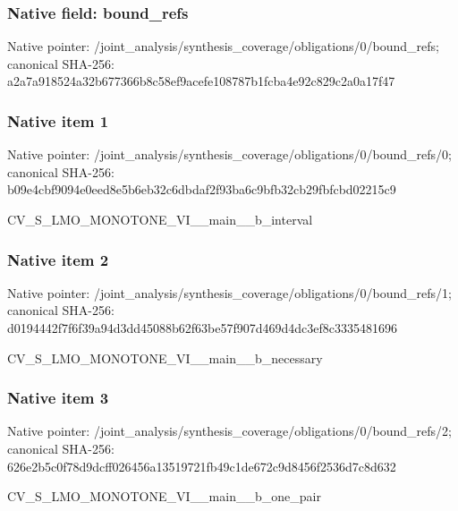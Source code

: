 \documentclass[10pt,a4paper]{article}
\begin{document}
\subsubsection{Native field: bound\_\allowbreak{}refs}
Native pointer: /joint\_\allowbreak{}analysis/synthesis\_\allowbreak{}coverage/obligations/0/bound\_\allowbreak{}refs; canonical SHA-256: a2a7a918524a32b677366b8c58ef9acefe108787b1fcba4e92c829c2a0a17f47

\subsubsection{Native item 1}
Native pointer: /joint\_\allowbreak{}analysis/synthesis\_\allowbreak{}coverage/obligations/0/bound\_\allowbreak{}refs/0; canonical SHA-256: b09e4cbf9094e0eed8e5b6eb32c6dbdaf2f93ba6c9bfb32cb29fbfcbd02215c9

\begingroup\raggedright\sloppy CV\_\allowbreak{}S\_\allowbreak{}LMO\_\allowbreak{}MONOTONE\_\allowbreak{}VI\_\allowbreak{}\_\allowbreak{}main\_\allowbreak{}\_\allowbreak{}b\_\allowbreak{}interval\par\endgroup

\subsubsection{Native item 2}
Native pointer: /joint\_\allowbreak{}analysis/synthesis\_\allowbreak{}coverage/obligations/0/bound\_\allowbreak{}refs/1; canonical SHA-256: d0194442f7f6f39a94d3dd45088b62f63be57f907d469d4dc3ef8c3335481696

\begingroup\raggedright\sloppy CV\_\allowbreak{}S\_\allowbreak{}LMO\_\allowbreak{}MONOTONE\_\allowbreak{}VI\_\allowbreak{}\_\allowbreak{}main\_\allowbreak{}\_\allowbreak{}b\_\allowbreak{}necessary\par\endgroup

\subsubsection{Native item 3}
Native pointer: /joint\_\allowbreak{}analysis/synthesis\_\allowbreak{}coverage/obligations/0/bound\_\allowbreak{}refs/2; canonical SHA-256: 626e2b5c0f78d9dcff026456a13519721fb49c1de672c9d8456f2536d7c8d632

\begingroup\raggedright\sloppy CV\_\allowbreak{}S\_\allowbreak{}LMO\_\allowbreak{}MONOTONE\_\allowbreak{}VI\_\allowbreak{}\_\allowbreak{}main\_\allowbreak{}\_\allowbreak{}b\_\allowbreak{}one\_\allowbreak{}pair\par\endgroup
\end{document}
